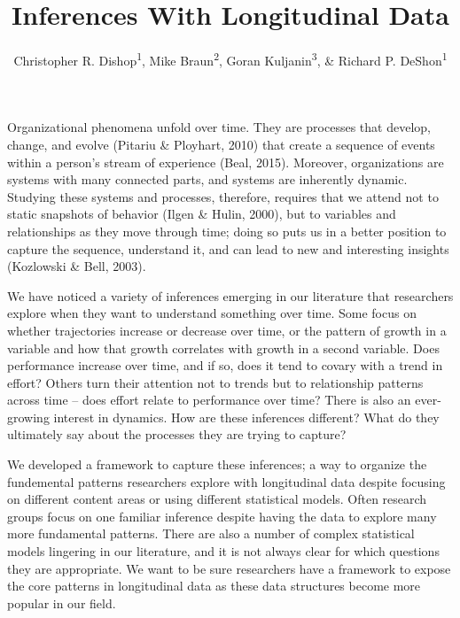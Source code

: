 \documentclass[english,,man]{apa6}
\title{Inferences With Longitudinal Data}
\author{Christopher R. Dishop\textsuperscript{1}, Mike Braun\textsuperscript{2},
Goran Kuljanin\textsuperscript{3}, \& Richard P.
DeShon\textsuperscript{1}}
\date{}
\affiliation{
\vspace{0.5cm}
\textsuperscript{1} Michigan State University\\\textsuperscript{2} University of South Florida\\\textsuperscript{3} DePaul University}
\theoremstyle{definition}
\theoremstyle{definition}
\theoremstyle{definition}
\theoremstyle{remark}
\begin{document}
\maketitle

Organizational phenomena unfold over time. They are processes that
develop, change, and evolve (Pitariu \& Ployhart, 2010) that create a
sequence of events within a person's stream of experience (Beal, 2015).
Moreover, organizations are systems with many connected parts, and
systems are inherently dynamic. Studying these systems and processes,
therefore, requires that we attend not to static snapshots of behavior
(Ilgen \& Hulin, 2000), but to variables and relationships as they move
through time; doing so puts us in a better position to capture the
sequence, understand it, and can lead to new and interesting insights
(Kozlowski \& Bell, 2003).

We have noticed a variety of inferences emerging in our literature that
researchers explore when they want to understand something over time.
Some focus on whether trajectories increase or decrease over time, or
the pattern of growth in a variable and how that growth correlates with
growth in a second variable. Does performance increase over time, and if
so, does it tend to covary with a trend in effort? Others turn their
attention not to trends but to relationship patterns across time -- does
effort relate to performance over time? There is also an ever-growing
interest in dynamics. How are these inferences different? What do they
ultimately say about the processes they are trying to capture?

We developed a framework to capture these inferences; a way to organize
the fundemental patterns researchers explore with longitudinal data
despite focusing on different content areas or using different
statistical models. Often research groups focus on one familiar
inference despite having the data to explore many more fundamental
patterns. There are also a number of complex statistical models
lingering in our literature, and it is not always clear for which
questions they are appropriate. We want to be sure researchers have a
framework to expose the core patterns in longitudinal data as these data
structures become more popular in our field.
\end{document}
